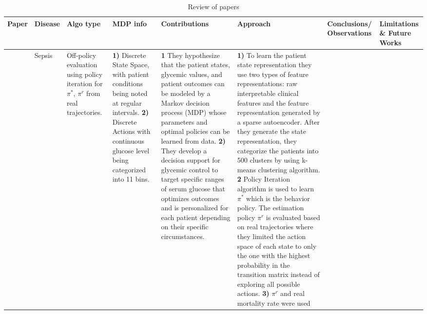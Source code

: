 \begin{table}[!th]
\caption{Review of papers}
\label{tab:review2}
\begin{tabular}{|p{3 em}|p{3 em}|p{3 em}|p{3em}|p{6em}|p{10em}|p{5 em}|p{6em}|}
\toprule
Paper  & Disease  & Algo type & MDP info & Contributions  & Approach & Conclusions/ Observations  & Limitations \& Future Works \\
\hline
\citet{DBLP:journals/corr/abs-1712-00654} & Sepsis 
& 
Off-policy evaluation using policy iteration for $\pi^*$, $\pi^r$ from real trajectories.
& 
\textbf{1)} Discrete State Space, with patient conditions being noted at regular intervals.
\textbf{2)} Discrete Actions with continuous glucose level being categorized into 11 bins.
&  
\textbf{1} They hypothesize that the patient states, glycemic values, and patient outcomes can be modeled by a Markov decision process (MDP) whose parameters and optimal policies can be learned from data. \textbf{2)} They develop a decision support for glycemic control to target specific ranges of serum glucose that optimizes outcomes and is  personalized for each patient depending on their specific circumstances.
%
&
\textbf{1)} To learn the patient state representation they use two types of
feature representations: raw interpretable clinical features and the feature representation generated
by a sparse autoencoder. After they generate the state representation, they categorize the patients into 500 clusters by using k-means clustering algorithm. \textbf{2} Policy Iteration algorithm is used to learn $\pi^*$ which is the behavior policy. The estimation policy $\pi^r$ is evaluated based on real trajectories where they  limited the action space of each state to only the one with the highest probability in the transition matrix  instead of exploring all possible actions. \textbf{3)} $\pi^r$ and real mortality rate were used

\end{tabular}
\end{table}
